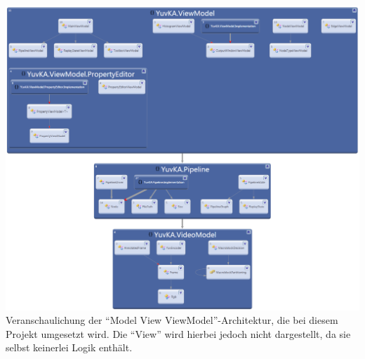 \includegraphics[width=\textwidth]{Diagrams/namespacedependencies.png}
Veranschaulichung der ``Model View ViewModel''-Architektur, die bei diesem Projekt umgesetzt wird. Die ``View'' wird hierbei jedoch nicht dargestellt, da sie selbst keinerlei Logik enthält.
